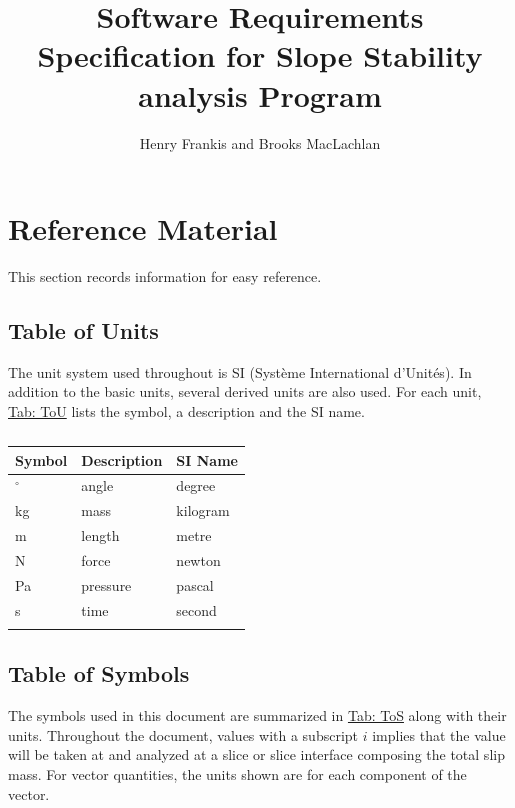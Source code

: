 \documentclass[12pt]{article}
\title{Software Requirements Specification for Slope Stability analysis Program}
\author{Henry Frankis and Brooks MacLachlan}
\begin{document}
\maketitle
\tableofcontents
\newpage
\section{Reference Material}
\label{Sec:RefMat}
This section records information for easy reference.

\subsection{Table of Units}
\label{Sec:ToU}
The unit system used throughout is SI (Système International d'Unités). In addition to the basic units, several derived units are also used. For each unit, \hyperref[Table:ToU]{Tab: ToU} lists the symbol, a description and the SI name.

\begin{longtable}{l l l}
\toprule
\textbf{Symbol} & \textbf{Description} & \textbf{SI Name}
\\
\midrule
\endhead
${}^{\circ}$ & angle & degree
\\
kg & mass & kilogram
\\
m & length & metre
\\
N & force & newton
\\
Pa & pressure & pascal
\\
s & time & second
\\
\bottomrule
\caption{}
\label{Table:ToU}
\end{longtable}
\subsection{Table of Symbols}
\label{Sec:ToS}
The symbols used in this document are summarized in \hyperref[Table:ToS]{Tab: ToS} along with their units. Throughout the document, values with a subscript $i$ implies that the value will be taken at and analyzed at a slice or slice interface composing the total slip mass. For vector quantities, the units shown are for each component of the vector.
\end{document}
